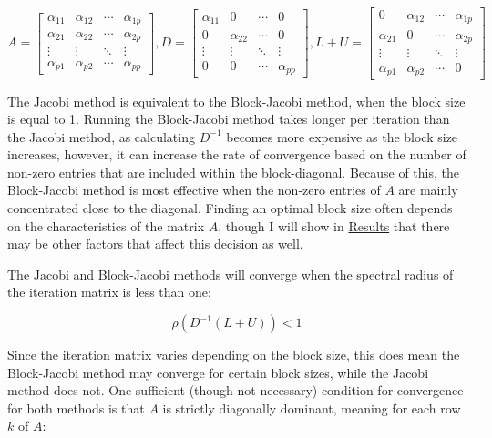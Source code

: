 \documentclass[pageno]{jpaper}
\begin{document}
\begin{doublespacing}
$$A = \left[ \begin{array}{c|c|c|c}
\alpha_{11} & \alpha_{12} & \cdots & \alpha_{1p} \\ \hline
\alpha_{21} & \alpha_{22} & \cdots & \alpha_{2p} \\ \hline
\vdots & \vdots & \ddots & \vdots \\ \hline
\alpha_{p1} & \alpha_{p2} & \cdots & \alpha_{pp}
\end{array} \right],
D = \left[ \begin{array}{c|c|c|c}
\alpha_{11} & 0 & \cdots & 0 \\ \hline
0 & \alpha_{22} & \cdots & 0 \\ \hline
\vdots & \vdots & \ddots & \vdots \\ \hline
0 & 0 & \cdots & \alpha_{pp}
\end{array} \right],
L + U = \left[ \begin{array}{c|c|c|c}
0 & \alpha_{12} & \cdots & \alpha_{1p} \\ \hline
\alpha_{21} & 0 & \cdots & \alpha_{2p} \\ \hline
\vdots & \vdots & \ddots & \vdots \\ \hline
\alpha_{p1} & \alpha_{p2} & \cdots & 0
\end{array} \right]$$

The Jacobi method is equivalent to the Block-Jacobi method, when the block size is equal to 1. Running the Block-Jacobi method takes longer per iteration than the Jacobi method, as calculating $D^{-1}$ becomes more expensive as the block size increases, however, it can increase the rate of convergence based on the number of non-zero entries that are included within the block-diagonal. Because of this, the Block-Jacobi method is most effective when the non-zero entries of $A$ are mainly concentrated close to the diagonal. Finding an optimal block size often depends on the characteristics of the matrix $A$, though I will show in \hyperref[sec:results]{Results} that there may be other factors that affect this decision as well.

The Jacobi and Block-Jacobi methods will converge when the spectral radius of the iteration matrix is less than one:

$$\rho(D^{-1}(L + U)) < 1$$

Since the iteration matrix varies depending on the block size, this does mean the Block-Jacobi method may converge for certain block sizes, while the Jacobi method does not. One sufficient (though not necessary) condition for convergence for both methods is that $A$ is strictly diagonally dominant, meaning for each row $k$ of $A$:


\end{doublespacing}
\end{document}
